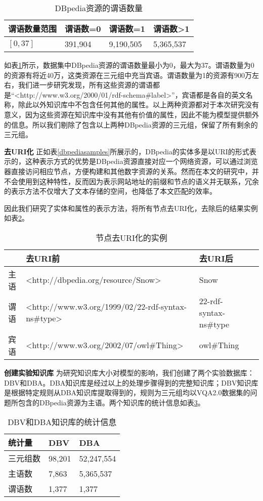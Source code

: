 \begin{table}[H]
\centering
\caption{DBpedia资源的谓语数量}
\begin{tabular}{llll}
\toprule
谓语数量范围 & 谓语数=0 & 谓语数=1 & 谓语数>1\\
\midrule
$[0, 37]$ &  391,904 &  9,190,505 & 5,365,537\\
\bottomrule
\end{tabular}
\label{predicateNum}
\end{table}

如表\ref{predicateNum}所示，数据集中DBpedia资源的谓语数量最小为0，最大为37。谓语数量为0的资源有将近40万，这类资源在三元组中充当宾语。谓语数量为1的资源有900万左右，我们进一步研究发现，所有这些资源的谓语都是“<http://www.w3.org/2000/01/rdf-schema\#label>”，宾语都是各自的英文名称，除此以外知识库中不包含任何其他的属性。以上两种资源都对于本次研究没有意义，因为这些资源在知识库中没有其他有价值的属性，因此不能为模型提供额外的信息。所以我们剔除了包含以上两种DBpedia资源的三元组，保留了所有剩余的三元组。

\textbf{去URI化}\qquad
正如表\ref{dbpediasamples}所展示的，DBpedia的实体多是以URI的形式表示的，这种表示方式的优势是DBpedia资源直接对应一个网络资源，可以通过浏览器直接访问相应节点，方便构建和其他数字资源的关系。然而在本文的研究中，并不会使用到这种特性，反而因为表示网站地址的前缀和节点的语义并无联系，冗余的表示方法不仅增大了文本存储的空间，也降低了本文匹配的效率。

因此我们研究了实体和属性的表示方法，将所有节点去URI化，去除后的结果实例如表\ref{deuri}。
\begin{table}[H]
\centering
\caption{节点去URI化的实例}
\begin{tabular}{llll}
\toprule
 & 去URI前 & 去URI后\\
\midrule
主语 &  <http://dbpedia.org/resource/Snow> &  Snow \\
谓语 & <http://www.w3.org/1999/02/22-rdf-syntax-ns\#type>  & 22-rdf-syntax-ns\#type \\
宾语 & <http://www.w3.org/2002/07/owl\#Thing> & owl\#Thing\\
\bottomrule
\end{tabular}
\label{deuri}
\end{table}

\textbf{创建实验知识库}\qquad
为研究知识库大小对模型的影响，我们创建了两个实验数据库：DBV和DBA。DBA知识库是经过以上的处理步骤得到的完整知识库；DBV知识库是根据特定规则从DBA知识库提取得到的，规则为三元组均以VQA2.0数据集的问题所包含的DBpedia资源为主语。两个知识库的统计信息如表\ref{DBV-DBA}。
\begin{table}[H]
\centering
\caption{DBV和DBA知识库的统计信息}
\begin{tabular}{lll}
\toprule
统计量 & DBV & DBA \\
\midrule
三元组数 & 98,201 & 52,247,554 \\
主语数 &  7,863 &  5,365,537 \\
谓语数 & 1,377 & 1,377 \\
\bottomrule
\end{tabular}
\label{DBV-DBA}
\end{table}

